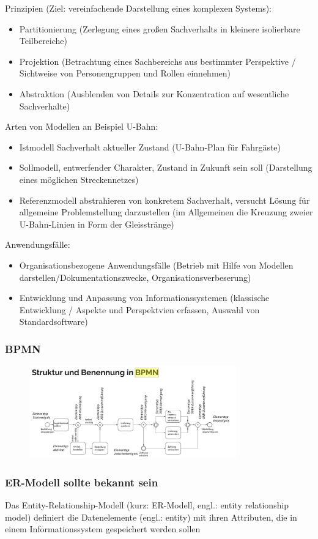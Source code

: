 Prinzipien (Ziel: vereinfachende Darstellung eines komplexen Systems):
\begin{itemize}
 \item Partitionierung (Zerlegung eines großen Sachverhalts in kleinere isolierbare Teilbereiche)
 \item Projektion (Betrachtung eines Sachbereichs aus bestimmter Perspektive / Sichtweise von Personengruppen und Rollen einnehmen)
 \item Abstraktion (Ausblenden von Details zur Konzentration auf wesentliche Sachverhalte)
\end{itemize}

Arten von Modellen an Beispiel U-Bahn:
\begin{itemize}
 \item Istmodell Sachverhalt aktueller Zustand (U-Bahn-Plan für Fahrgäste)
 \item Sollmodell, entwerfender Charakter, Zustand in Zukunft sein soll (Darstellung eines möglichen Streckennetzes)
 \item Referenzmodell abstrahieren von konkretem Sachverhalt, versucht Lösung für allgemeine Problemstellung darzustellen  (im Allgemeinen die Kreuzung zweier U-Bahn-Linien in Form der Gleisstränge)
\end{itemize}

Anwendungsfälle:
\begin{itemize}
 \item Organisationsbezogene Anwendungsfälle (Betrieb mit Hilfe von Modellen darstellen/Dokumentationszwecke, Organisationsverbeserung)
 \item Entwicklung und Anpassung von Informationssystemen (klassische Entwicklung / Aspekte und Perspektvien erfassen, Auswahl von Standardsoftware)
\end{itemize}

\subsubsection{BPMN}
\begin{figure}[htp]
\begin{center}
\includegraphics[width=0.8\textwidth]{assets/BPMN.PNG}
\end{center}
\end{figure}

\subsubsection{ER-Modell sollte bekannt sein}
Das Entity-Relationship-Modell (kurz: ER-Modell, engl.: entity relationship model) definiert die Datenelemente (engl.: entity) mit ihren Attributen, die in einem Informationssystem gespeichert werden sollen


